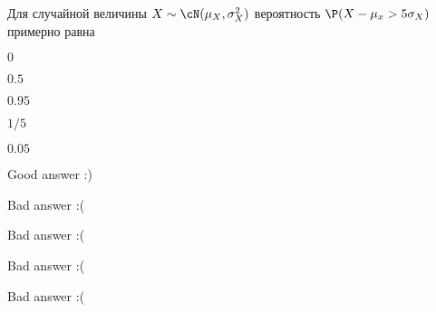 
\begin{question}
Для случайной величины \(X \sim \cN(\mu_X, \sigma^2_X)\) вероятность
\(\P(X - \mu_x > 5\sigma_X)\) примерно равна
\begin{answerlist}
  \item \(0\)
  \item \(0.5\)
  \item \(0.95\)
  \item \(1/5\)
  \item \(0.05\)
\end{answerlist}
\end{question}

\begin{solution}
\begin{answerlist}
  \item Good answer :)
  \item Bad answer :(
  \item Bad answer :(
  \item Bad answer :(
  \item Bad answer :(
\end{answerlist}
\end{solution}

